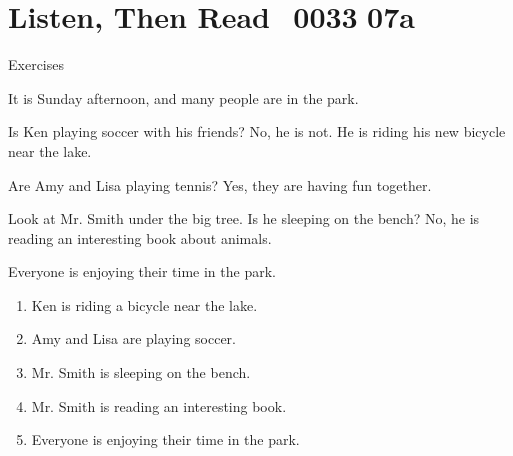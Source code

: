 \documentclass[aspectratio=169,xcolor={dvipsnames,table}]{beamer}
\newcommand{\myaudio}[1]{\href{#1}{\faVolumeUp}}
\begin{document}
\section{Listen, Then Read\,\,\,\,\,{\tiny 0033}\,{\scriptsize \myaudio{./audio/023_is_ing_question_reading.mp3}\,07a}}
\begin{frame}[plain,t]{Exercises}
\vspace*{-8pt}
\begin{tcolorbox}[colframe=ForestGreen,
  colback=NavyBlue!10!white,
  colbacktitle=NavyBlue!40!white,
  coltitle=black, %
before upper={\setlength{\parindent}{1.25em}},
 title={Sunday Afternoon in the Park\hfill{\tiny 0033}\quad{\scriptsize \myaudio{./audio/023_is_ing_question_reading.mp3}}}
]
\noindent{}It is Sunday afternoon, and many people are in the park.

Is Ken playing soccer with his friends? No, he is not.
He is riding his new bicycle near the lake.

Are Amy and Lisa playing tennis? Yes, they are having fun together.

Look at Mr. Smith under the big tree. Is he sleeping on the bench?
No, he is reading an interesting book about animals.

Everyone is enjoying their time in the park.
\end{tcolorbox}

\vspace{-4pt}
\vspace{-11pt}
\begin{enumerate}\setlength{\itemsep}{-3.2pt}
\item<2-> Ken is riding a bicycle near the lake.\hfill{}
\item<2-> Amy and Lisa are playing soccer.\hfill{}
\item<2-> Mr. Smith is sleeping on the bench.\hfill{}
\item<2-> Mr. Smith is reading an interesting book.\hfill{}
\item<2-> Everyone is enjoying their time in the park.\hfill{}
\end{enumerate}
\end{frame}
\end{document}
